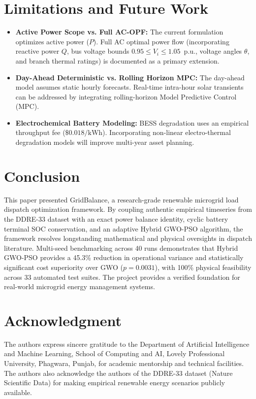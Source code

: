 \documentclass[conference]{IEEEtran}
\begin{document}
\section{Limitations and Future Work}
\begin{itemize}
    \item \textbf{Active Power Scope vs. Full AC-OPF:} The current formulation optimizes active power ($P$). Full AC optimal power flow (incorporating reactive power $Q$, bus voltage bounds $0.95 \le V_i \le 1.05$~p.u., voltage angles $\theta$, and branch thermal ratings) is documented as a primary extension.
    \item \textbf{Day-Ahead Deterministic vs. Rolling Horizon MPC:} The day-ahead model assumes static hourly forecasts. Real-time intra-hour solar transients can be addressed by integrating rolling-horizon Model Predictive Control (MPC).
    \item \textbf{Electrochemical Battery Modeling:} BESS degradation uses an empirical throughput fee ($\$0.018/\text{kWh}$). Incorporating non-linear electro-thermal degradation models will improve multi-year asset planning.
\end{itemize}

\section{Conclusion}
This paper presented GridBalance, a research-grade renewable microgrid load dispatch optimization framework. By coupling authentic empirical timeseries from the DDRE-33 dataset with an exact power balance identity, cyclic battery terminal SOC conservation, and an adaptive Hybrid GWO-PSO algorithm, the framework resolves longstanding mathematical and physical oversights in dispatch literature. Multi-seed benchmarking across 40 runs demonstrates that Hybrid GWO-PSO provides a 45.3\% reduction in operational variance and statistically significant cost superiority over GWO ($p = 0.0031$), with 100\% physical feasibility across 33 automated test suites. The project provides a verified foundation for real-world microgrid energy management systems.

\section*{Acknowledgment}
The authors express sincere gratitude to the Department of Artificial Intelligence and Machine Learning, School of Computing and AI, Lovely Professional University, Phagwara, Punjab, for academic mentorship and technical facilities. The authors also acknowledge the authors of the DDRE-33 dataset (Nature Scientific Data) for making empirical renewable energy scenarios publicly available.
\end{document}

